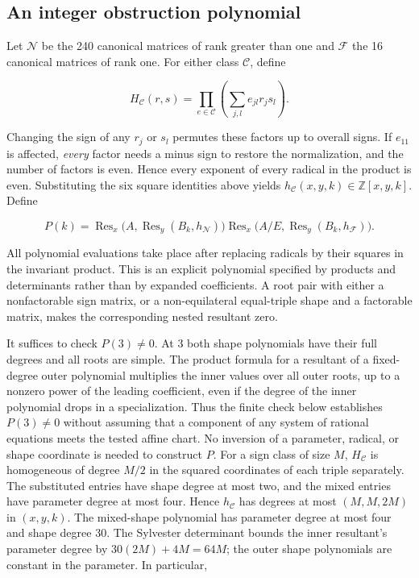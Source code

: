 \documentclass[11pt]{article}
\begin{document}
\subsection*{An integer obstruction polynomial}

Let \(\mathcal N\) be the 240 canonical matrices of rank greater than one and \(\mathcal F\) the 16 canonical matrices of rank one. For either class \(\mathcal C\), define

\[
H_{\mathcal C}(r,s)=
\prod_{e\in\mathcal C}\left(\sum_{j,l} e_{jl}r_js_l\right).
\]

Changing the sign of any \(r_j\) or \(s_l\) permutes these factors up to overall signs. If \(e_{11}\) is affected, \emph{every} factor needs a minus sign to restore the normalization, and the number of factors is even. Hence every exponent of every radical in the product is even. Substituting the six square identities above yields \(h_{\mathcal C}(x,y,k)\in\mathbb Z[x,y,k]\). Define

\[
P(k)=\operatorname{Res}_x\big(A,\operatorname{Res}_y(B_k,h_{\mathcal N})\big)
\operatorname{Res}_x\big(A/E,\operatorname{Res}_y(B_k,h_{\mathcal F})\big).
\]

All polynomial evaluations take place after replacing radicals by their squares in the invariant product. This is an explicit polynomial specified by products and determinants rather than by expanded coefficients. A root pair with either a nonfactorable sign matrix, or a non-equilateral equal-triple shape and a factorable matrix, makes the corresponding nested resultant zero.

It suffices to check \(P(3)\ne0\). At 3 both shape polynomials have their full degrees and all roots are simple. The product formula for a resultant of a fixed-degree outer polynomial multiplies the inner values over all outer roots, up to a nonzero power of the leading coefficient, even if the degree of the inner polynomial drops in a specialization. Thus the finite check below establishes \(P(3)\ne0\) without assuming that a component of any system of rational equations meets the tested affine chart. No inversion of a parameter, radical, or shape coordinate is needed to construct \(P\). For a sign class of size \(M\), \(H_{\mathcal C}\) is homogeneous of degree \(M/2\) in the squared coordinates of each triple separately. The substituted entries have shape degree at most two, and the mixed entries have parameter degree at most four. Hence \(h_{\mathcal C}\) has degrees at most \((M,M,2M)\) in \((x,y,k)\). The mixed-shape polynomial has parameter degree at most four and shape degree 30. The Sylvester determinant bounds the inner resultant's parameter degree by \(30(2M)+4M=64M\); the outer shape polynomials are constant in the parameter. In particular,
\end{document}
